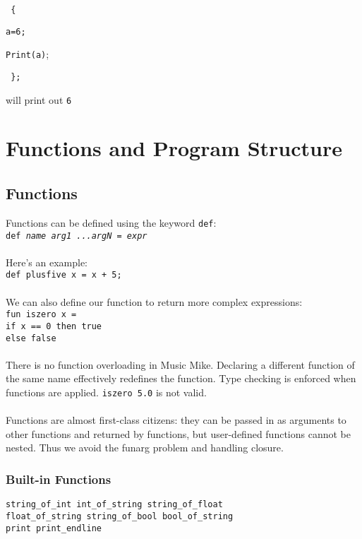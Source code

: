 \documentclass[12pt]{report}
\begin{document}
\texttt{ \{ }

\texttt{a=6; }

\texttt{Print(a)};

\texttt{ \};}

will print out \texttt{6}






\chapter{Functions and Program Structure}

\section{Functions}
Functions can be defined using the keyword \texttt{def}:\\
\texttt{def \emph{name arg1 ...argN} = \emph{expr}}\\\\
Here's an example:\\
\texttt{def plusfive x = x + 5;}\\\\
We can also define our function to return more complex expressions:\\ \texttt{fun iszero x = \\if x == 0 then true \\else false} \\ \\ There is no function overloading in Music Mike. Declaring a different function of the same name effectively redefines the function. Type checking is enforced when functions are applied. \texttt{iszero 5.0} is not valid.\\\\
Functions are almost first-class citizens: they can be passed in as arguments to other functions and returned by functions, but user-defined functions cannot be nested. Thus we avoid the funarg problem and handling closure.





\subsection{Built-in Functions}

\texttt{string\_of\_int int\_of\_string string\_of\_float \\ float\_of\_string string\_of\_bool bool\_of\_string \\
print print\_endline}
\end{document}
